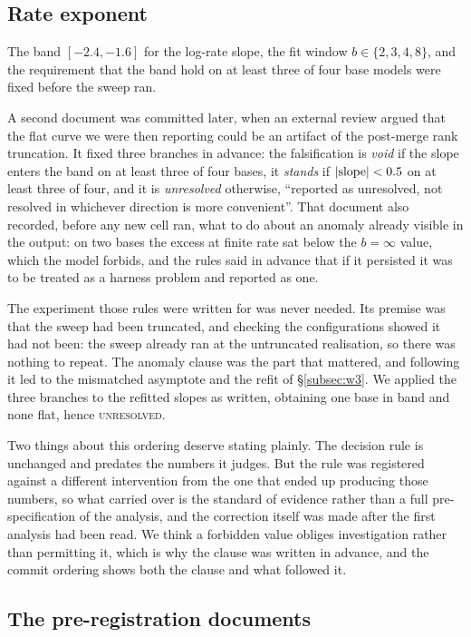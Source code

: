 \subsection{Rate exponent}\label{subsec:rate-prereg}

The band $[-2.4, -1.6]$ for the log-rate slope, the fit window
$b \in \{2,3,4,8\}$, and the requirement that the band hold on at least
three of four base models were fixed before the sweep ran.

A second document was committed later, when an external review argued that
the flat curve we were then reporting could be an artifact of the
post-merge rank truncation. It fixed three branches in advance: the
falsification is \emph{void} if the slope enters the band on at least
three of four bases, it \emph{stands} if $|{\rm slope}| < 0.5$ on at least
three of four, and it is \emph{unresolved} otherwise, ``reported as
unresolved, not resolved in whichever direction is more convenient''. That
document also recorded, before any new cell ran, what to do about an
anomaly already visible in the output: on two bases the excess at finite
rate sat below the $b = \infty$ value, which the model forbids, and the
rules said in advance that if it persisted it was to be treated as a
harness problem and reported as one.

The experiment those rules were written for was never needed. Its premise
was that the sweep had been truncated, and checking the configurations
showed it had not been: the sweep already ran at the untruncated
realisation, so there was nothing to repeat. The anomaly clause was the
part that mattered, and following it led to the mismatched asymptote and
the refit of \S\ref{subsec:w3}. We applied the three branches to the
refitted slopes as written, obtaining one base in band and none flat,
hence \textsc{unresolved}.

Two things about this ordering deserve stating plainly. The decision rule
is unchanged and predates the numbers it judges. But the rule was
registered against a different intervention from the one that ended up
producing those numbers, so what carried over is the standard of evidence
rather than a full pre-specification of the analysis, and the correction
itself was made after the first analysis had been read. We think a
forbidden value obliges investigation rather than permitting it, which is
why the clause was written in advance, and the commit ordering shows both
the clause and what followed it.

\subsection{The pre-registration documents}\label{subsec:prereg-docs}

